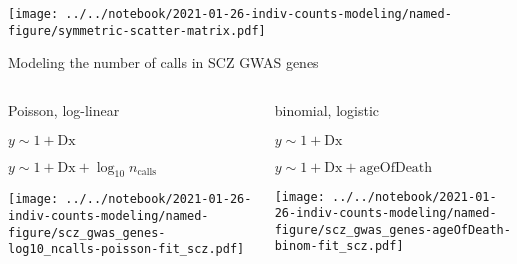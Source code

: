\documentclass[usenames,dvipsnames]{beamer}
\begin{document}
\begin{frame}
\texttt{[image: ../../notebook/2021-01-26-indiv-counts-modeling/named-figure/symmetric-scatter-matrix.pdf]}
\end{frame}

\begin{frame}{Modeling the number of calls in SCZ GWAS genes}
\begin{columns}[t]
\begin{column}{0.5\textwidth}
\begin{center}
Poisson, log-linear
\begin{description}
\tiny
\item[M0] \(y \sim 1 + \mathrm{Dx}\)
\item[M1] \(y \sim 1 + \mathrm{Dx} + \log_{10} n_\mathrm{calls}\)
\end{description}
\end{center}
\texttt{[image: ../../notebook/2021-01-26-indiv-counts-modeling/named-figure/scz\_gwas\_genes-log10\_ncalls-poisson-fit\_scz.pdf]}
\end{column}

\begin{column}{0.5\textwidth}
\begin{center}
binomial, logistic
\begin{description}
\tiny
\item[M0] \(y \sim 1 + \mathrm{Dx}\)
\item[M1] \(y \sim 1 + \mathrm{Dx} + \mathrm{ageOfDeath}\)
\end{description}
\end{center}
\texttt{[image: ../../notebook/2021-01-26-indiv-counts-modeling/named-figure/scz\_gwas\_genes-ageOfDeath-binom-fit\_scz.pdf]}
\end{column}
\end{columns}
\begin{center}
\end{center}
\end{frame}
\end{document}
